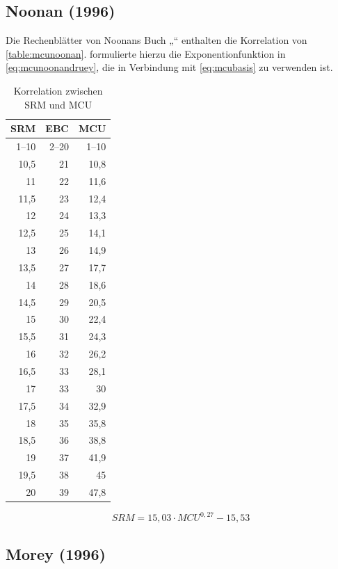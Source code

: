 \documentclass[a4paper,parskip=half]{scrartcl}
\newcommand{\MCUL}{\mathit{MCU}}
\newcommand{\SRM}{\mathit{SRM}}
\begin{document}
\subsection*{Noonan (1996)}

Die Rechenblätter von Noonans Buch „“ enthalten die Korrelation von \autoref{table:mcunoonan}. \textcite{Druey1998} formulierte hierzu die Exponentionfunktion in \autoref{eq:mcunoonandruey}, die in Verbindung mit \autoref{eq:mcubasis} zu verwenden ist.

\begin{table}[H]
\centering
\begin{tabular}{rrr}
\toprule
\multicolumn{1}{c}{\textbf{SRM}} & \multicolumn{1}{c}{\textbf{EBC}} & \multicolumn{1}{c}{\textbf{MCU}} \\
\midrule
1–10 & 2–20 & 1–10 \\
10,5 & 21 & 10,8 \\
11   & 22 & 11,6 \\
11,5 & 23 & 12,4 \\
12   & 24 & 13,3 \\
12,5 & 25 & 14,1 \\
13   & 26 & 14,9 \\
13,5 & 27 & 17,7 \\
14   & 28 & 18,6 \\
14,5 & 29 & 20,5 \\
15   & 30 & 22,4 \\
15,5 & 31 & 24,3 \\
16   & 32 & 26,2 \\
16,5 & 33 & 28,1 \\
17   & 33 & 30 \\
17,5 & 34 & 32,9 \\
18   & 35 & 35,8 \\
18,5 & 36 & 38,8 \\
19   & 37 & 41,9 \\
19,5 & 38 & 45 \\
20   & 39 & 47,8 \\
\bottomrule
\end{tabular}
\caption{Korrelation zwischen SRM und MCU \parencite[206]{Noonan1996}}
\label{table:mcunoonan}
\end{table}

\begin{equation}
\SRM = 15,03 \cdot \MCUL^{0,27} - 15,53
\label{eq:mcunoonandruey}
\end{equation}

\subsection*{Morey (1996)}
\end{document}
